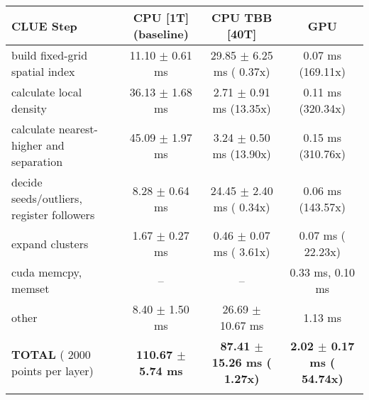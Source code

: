     \begin{tabular}{l|c|c|c}
    \hline
    CLUE Step                                 & CPU [1T] (baseline)         & CPU TBB [40T]                         & GPU                       \\ \hline
    build fixed-grid spatial index            &  11.10 $\pm$  0.61 ms       &  29.85 $\pm$  6.25 ms ( 0.37x)        &   0.07 ms (169.11x)       \\
    calculate local density                   &  36.13 $\pm$  1.68 ms       &   2.71 $\pm$  0.91 ms (13.35x)        &   0.11 ms (320.34x)       \\
    calculate nearest-higher and separation   &  45.09 $\pm$  1.97 ms       &   3.24 $\pm$  0.50 ms (13.90x)        &   0.15 ms (310.76x)       \\
    decide seeds/outliers, register followers &   8.28 $\pm$  0.64 ms       &  24.45 $\pm$  2.40 ms ( 0.34x)        &   0.06 ms (143.57x)       \\
    expand clusters                           &   1.67 $\pm$  0.27 ms       &   0.46 $\pm$  0.07 ms ( 3.61x)        &   0.07 ms ( 22.23x)       \\ \hline
    cuda memcpy, memset                       & --                          & --                                    &   0.33 ms,   0.10 ms      \\ 
    other                                     &   8.40 $\pm$  1.50 ms       &  26.69 $\pm$ 10.67 ms                 &   1.13 ms                 \\ \hline
    \textbf{TOTAL} ( 2000 points per layer)   & \textbf{110.67 $\pm$  5.74 ms} & \textbf{ 87.41 $\pm$ 15.26 ms ( 1.27x)} & \textbf{  2.02 $\pm$  0.17 ms ( 54.74x)}  \\
    \hline
    \multicolumn{4}{c}{} 
    \end{tabular}
    \linebreak


